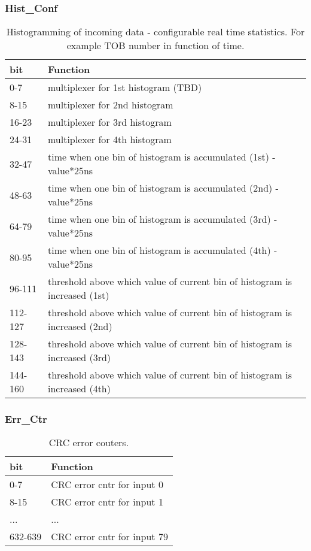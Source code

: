\subsubsection{Hist\_Conf}
\begin {table}[H]
\begin{center}
\begin{tabular}{|l|l|}
\hline
\textbf{bit} & \textbf{Function} \\
\hline
0-7 & multiplexer for 1st histogram (TBD)\\ \hline
8-15 & multiplexer for 2nd histogram\\ \hline
16-23 & multiplexer for 3rd histogram\\ \hline
24-31 & multiplexer for 4th histogram\\ \hline
32-47 & time when one bin of histogram is accumulated (1st) - value*25ns \\ \hline
48-63 & time when one bin of histogram is accumulated (2nd) - value*25ns \\ \hline
64-79 & time when one bin of histogram is accumulated (3rd) - value*25ns \\ \hline
80-95 & time when one bin of histogram is accumulated (4th) - value*25ns \\ \hline
96-111 & threshold above which value of current bin of histogram is increased (1st)\\ \hline
112-127 & threshold above which value of current bin of histogram is increased (2nd)\\ \hline
128-143 & threshold above which value of current bin of histogram is increased (3rd)\\ \hline
144-160 & threshold above which value of current bin of histogram is increased (4th)\\ \hline
\end{tabular}
\caption{Histogramming of incoming data - configurable real time statistics. For example TOB number in function of time.}
\end{center}
\end{table}

\subsubsection{Err\_Ctr}
\begin {table}[H]
\begin{center}
\begin{tabular}{|l|l|}
\hline
\textbf{bit} & \textbf{Function} \\
\hline
0-7 & CRC error cntr for input 0 \\ \hline
8-15 & CRC error cntr for input 1 \\ \hline
... & ... \\ \hline
632-639 & CRC error cntr for input 79 \\ \hline
\hline
\end{tabular}
\caption{CRC error couters.}
\end{center}
\end{table}

